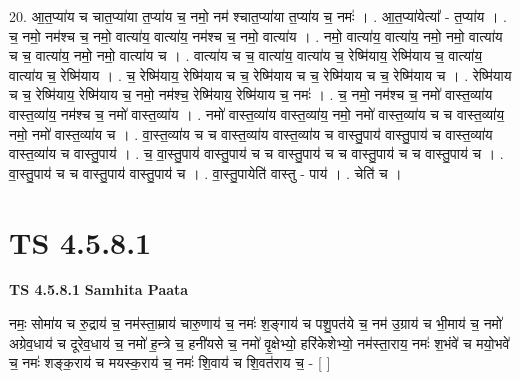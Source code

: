\documentclass[17pt]{extarticle}
\begin{document}
20. आ॒त॒प्या॑य च चात॒प्या॑या त॒प्या॑य च॒ नमो॒ नम॑ श्चात॒प्या॑या त॒प्या॑य च॒ नमः॑ । . आ॒त॒प्या॑येत्या᳚ - त॒प्या॑य । . च॒ नमो॒ नम॑श्च च॒ नमो॒ वात्या॑य॒ वात्या॑य॒ नम॑श्च च॒ नमो॒ वात्या॑य । . नमो॒ वात्या॑य॒ वात्या॑य॒ नमो॒ नमो॒ वात्या॑य च च॒ वात्या॑य॒ नमो॒ नमो॒ वात्या॑य च । . वात्या॑य च च॒ वात्या॑य॒ वात्या॑य च॒ रेष्मि॑याय॒ रेष्मि॑याय च॒ वात्या॑य॒ वात्या॑य च॒ रेष्मि॑याय । . च॒ रेष्मि॑याय॒ रेष्मि॑याय च च॒ रेष्मि॑याय च च॒ रेष्मि॑याय च च॒ रेष्मि॑याय च । . रेष्मि॑याय च च॒ रेष्मि॑याय॒ रेष्मि॑याय च॒ नमो॒ नम॑श्च॒ रेष्मि॑याय॒ रेष्मि॑याय च॒ नमः॑ । . च॒ नमो॒ नम॑श्च च॒ नमो॑ वास्त॒व्या॑य वास्त॒व्या॑य॒ नम॑श्च च॒ नमो॑ वास्त॒व्या॑य । . नमो॑ वास्त॒व्या॑य वास्त॒व्या॑य॒ नमो॒ नमो॑ वास्त॒व्या॑य च च वास्त॒व्या॑य॒ नमो॒ नमो॑ वास्त॒व्या॑य च । . वा॒स्त॒व्या॑य च च वास्त॒व्या॑य वास्त॒व्या॑य च वास्तु॒पाय॑ वास्तु॒पाय॑ च वास्त॒व्या॑य वास्त॒व्या॑य च वास्तु॒पाय॑ । . च॒ वा॒स्तु॒पाय॑ वास्तु॒पाय॑ च च वास्तु॒पाय॑ च च वास्तु॒पाय॑ च च वास्तु॒पाय॑ च । . वा॒स्तु॒पाय॑ च च वास्तु॒पाय॑ वास्तु॒पाय॑ च । . वा॒स्तु॒पायेति॑ वास्तु - पाय॑ । . चेति॑ च । \newline
\pagebreak
{}

\section{ TS 4.5.8.1 }

\textbf{TS 4.5.8.1 } \newline
\textbf{Samhita Paata} \newline

नमः॒ सोमा॑य च रु॒द्राय॑ च॒ नम॑स्ता॒म्राय॑ चारु॒णाय॑ च॒ नमः॑ श॒ङ्गाय॑ च पशु॒पत॑ये च॒ नम॑ उ॒ग्राय॑ च भी॒माय॑ च॒ नमो॑ अग्रेव॒धाय॑ च दूरेव॒धाय॑ च॒ नमो॑ ह॒न्त्रे च॒ हनी॑यसे च॒ नमो॑ वृ॒क्षेभ्यो॒ हरि॑केशेभ्यो॒ नम॑स्ता॒राय॒ नमः॑ श॒भंवे॑ च मयो॒भवे॑ च॒ नमः॑ शङ्क॒राय॑ च मयस्क॒राय॑ च॒ नमः॑ शि॒वाय॑ च शि॒वत॑राय च॒ - [  ] \newline
\end{document}
